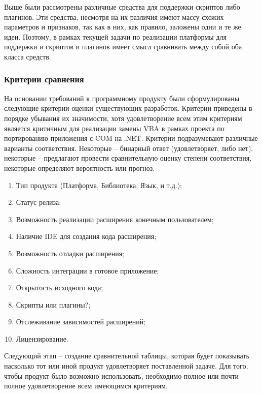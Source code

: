 Выше были рассмотрены различные средства для поддержки скриптов либо плагинов. Эти средства, несмотря на их различия имеют массу схожих параметров и признаков, так как в них, как правило, заложены одни и те же идеи. Поэтому, в рамках текущей задачи по реализации платформы для поддержки и скриптов и плагинов имеет смысл сравнивать между собой оба класса средств.

\subsubsection{Критерии сравнения}
\label{sec:comp_criteria}
На основании требований к программному продукту были сформулированы следующие критерии оценки существующих разработок. Критерии приведены в порядке убывания их значимости, хотя удовлетворение всем этим критериям является критичным для реализации замены VBA в рамках проекта по портированию приложения с COM на .NET. Критерии подразумевают различные варианты соответствия. Некоторые – бинарный ответ (удовлетворяет, либо нет), некоторые – предлагают провести сравнительную оценку степени соответствия, некоторые определяют вероятность или прогноз.

\begin{enumerate}
\item Тип продукта (Платформа, Библиотека, Язык, и т.д.);
\item Статус релиза;
\item Возможность реализации расширения конечным пользователем;
\item Наличие IDE для создания кода расширения;
\item Возможность отладки расширения;
\item Сложность интеграции в готовое приложение;
\item Открытость исходного кода;
\item Скрипты или плагины?;
\item Отслеживание зависимостей расширений;
\item Лицензирование.
\end{enumerate}

Следующий этап – создание сравнительной таблицы, которая будет показывать насколько тот или иной продукт удовлетворяет поставленной задаче. Для того, чтобы продукт было возможно использовать, необходимо полное или почти полное удовлетворение всем имеющимся критериям.

\pagebreak
